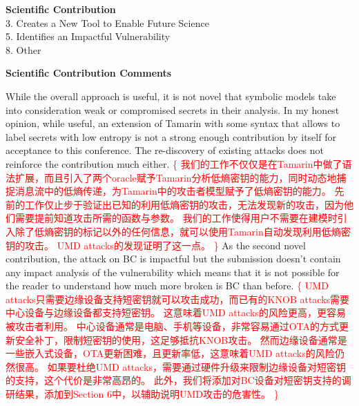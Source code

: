 \documentclass{article}
\newcommand{\response}[1]{\textcolor{red}{\{#1\}}}
\begin{document}
\rule{0pt}{8pt}

\noindent\textbf{Scientific Contribution}\\
3. Creates a New Tool to Enable Future Science\\
5. Identifies an Impactful Vulnerability\\
8. Other

\rule{0pt}{8pt}

\noindent\textbf{Scientific Contribution Comments}

While the overall approach is useful, it is not novel that symbolic models take into consideration weak or compromised secrets in their analysis. 
In my honest opinion, while useful, an extension of Tamarin with some syntax that allows to label secrets with low entropy is not a strong enough contribution by itself for acceptance to this conference. 
The re-discovery of existing attacks does not reinforce the contribution much either. 
\response{
    我们的工作不仅仅是在Tamarin中做了语法扩展，而且引入了两个oracle赋予Tamarin分析低熵密钥的能力，同时动态地捕捉消息流中的低熵传递，为Tamarin中的攻击者模型赋予了低熵密钥的能力。
    先前的工作仅止步于验证出已知的利用低熵密钥的攻击，无法发现新的攻击，因为他们需要提前知道攻击所需的函数与参数。
    我们的工作使得用户不需要在建模时引入除了低熵密钥的标记以外的任何信息，就可以使用Tamarin自动发现利用低熵密钥的攻击。
    UMD attacks的发现证明了这一点。
}
As the second novel contribution, the attack on BC is impactful but the submission doesn't contain any impact analysis of the vulnerability which means that it is not possible for the reader to understand how much more broken is BC than before.
\response{
    UMD attacks只需要边缘设备支持短密钥就可以攻击成功，而已有的KNOB attacks需要中心设备与边缘设备都支持短密钥。
    这意味着UMD attacks的风险更高，更容易被攻击者利用。
    中心设备通常是电脑、手机等设备，非常容易通过OTA的方式更新安全补丁，限制短密钥的使用，这足够抵抗KNOB攻击。
    然而边缘设备通常是一些嵌入式设备，OTA更新困难，且更新率低，这意味着UMD attacks的风险仍然很高。
    如果要杜绝UMD attacks，需要通过硬件升级来限制边缘设备对短密钥的支持，这个代价是非常高昂的。
    此外，我们将添加对BC设备对短密钥支持的调研结果，添加到Section 6中，以辅助说明UMD攻击的危害性。
}
\end{document}

